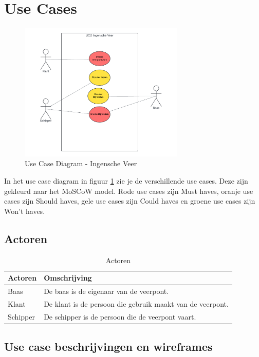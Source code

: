 \documentclass{article}
\begin{document}
\section{Use Cases}
\begin{figure}[h]
    \centering
    \includegraphics[width=0.7\textwidth]{images/iv_ucd_color.png}
    \caption{Use Case Diagram - Ingensche Veer}
    \label{fig:ucd}
\end{figure}
In het use case diagram in figuur \ref{fig:ucd} zie je de verschillende use cases. Deze zijn gekleurd naar het MoSCoW model. Rode use cases zijn Must haves, oranje use cases zijn Should haves, gele use cases zijn Could haves en groene use cases zijn Won't haves.

\subsection{Actoren}

\begin{table}[H]
    \centering
    \begin{tabularx}{\textwidth}{|l|X|}
        \hline
        \textbf{Actoren} & \textbf{Omschrijving}  \\
        \hline
        Baas & De baas is de eigenaar van de veerpont. \\
        \hline
        Klant  & De klant is de persoon die gebruik maakt van de veerpont. \\
        \hline
        Schipper & De schipper is de persoon die de veerpont vaart. \\
        \hline

    \end{tabularx}
    \caption{Actoren}
\end{table}

\subsection{Use case beschrijvingen en wireframes}
\end{document}
